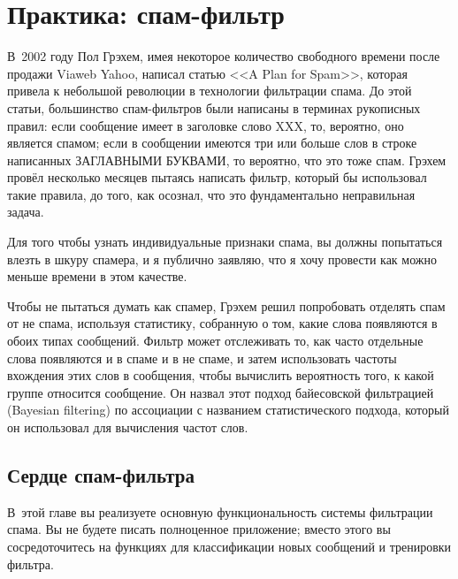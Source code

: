 \chapter{Практика: спам-фильтр}
\label{ch:23}

\thispagestyle{empty}

В~2002 году Пол Грэхем, имея некоторое количество свободного времени пос\-ле продажи
Viaweb Yahoo, написал статью <<A Plan for Spam>>, которая привела к небольшой революции в технологии
фильтрации спама.  До этой статьи, большинство спам-фильтров были написаны в терминах
рукописных правил: если сообщение имеет в заголовке слово XXX, то, вероятно, оно является
спамом; если в сообщении имеются три или больше слов в строке написанных ЗАГЛАВНЫМИ
БУКВАМИ, то вероятно, что это тоже спам. Грэхем провёл несколько месяцев пытаясь написать
фильтр, который бы использовал такие правила, до того, как осознал, что это фундаментально
неправильная задача.

Для того чтобы узнать индивидуальные признаки спама, вы должны попытаться влезть в шкуру
спамера, и я публично заявляю, что я хочу провести как можно меньше времени в этом
качестве.

Чтобы не пытаться думать как спамер, Грэхем решил попробовать отделять спам от не спама,
используя статистику, собранную о том, какие слова появляются в обоих типах сообщений.
Фильтр может отслеживать то, как часто отдельные слова появляются и в спаме и в не спаме,
и затем использовать частоты вхождения этих слов в сообщения, чтобы вычислить вероятность
того, к какой группе относится сообщение.  Он назвал этот подход байесовской фильтрацией
(Bayesian filtering) по ассоциации с названием статистического подхода, который он
использовал для вычисления частот слов.

\section{Сердце спам-фильтра}

В~этой главе вы реализуете основную функциональность системы фильтрации спама.  Вы не
будете писать полноценное приложение; вместо этого вы сосредоточитесь на функциях для
классификации новых сообщений и тренировки фильтра.

